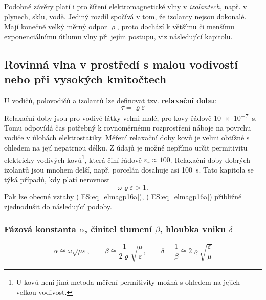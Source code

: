 {        Podobné závěry platí i pro šíření elektromagnetické vlny v \emph{izolantech}, např. v 
        plynech, sklu, vodě. Jediný rozdíl spočívá v tom, že izolanty nejsou dokonalé. Mají konečně 
        velký měrný odpor \(\varrho\), proto dochází k většímu či menšímu exponenciálnímu útlumu 
        vlny při jejím postupu, viz následující kapitolu.

    \subsection{Rovinná vlna v prostředí s malou vodivostí nebo při vysokých kmitočtech}
      U vodičů, polovodičů a izolantů lze definovat tzv. \textbf{relaxační dobu}:
      \begin{equation}\label{ES:eq_elmagp42}
        \tau = \varrho\varepsilon
      \end{equation}
      Relaxační doby jsou pro vodivé látky velmi malé, pro kovy řádově \SI{10e-7}{\s}. Tomu 
      odpovídá čas potřebný k rovnoměrnému rozprostření náboje na povrchu vodiče v úlohách 
      elektrostatiky. Měření relaxační doby kovů je velmi obtížné s ohledem na její nepatrnou 
      délku. Z údajů je možné nepřímo určit permitivitu elektricky vodivých kovů\footnote{U 
      kovů není jiná metoda měření permitivity možná s ohledem na jejich velkou vodivost.}, která 
      činí řádově \(\varepsilon_r \approx 100\). Relaxační doby dobrých izolantů jsou mnohem delší, 
      např. porcelán dosahuje asi \SI{100}{\s}. Tato kapitola se týká případů, kdy platí nerovnost
      \begin{equation}\label{ES:eq_elmagp43}
        \omega\varrho\varepsilon > 1.
      \end{equation}
      Pak lze obecné vztahy (\ref{ES:eq_elmagp16a}), (\ref{ES:eq_elmagp16a}) přibližně zjednodušit 
      do následující podoby.

    \subsubsection{Fázová konstanta \(\alpha\), činitel tlumení \(\beta\), hloubka vniku 
                     \(\delta\)}
       \begin{equation}\label{ES:eq_elmagp44}
         \alpha \cong \omega\sqrt{\mu\varepsilon}, \qquad
         \beta  \cong \frac{1}{2\varrho}\sqrt{\frac{\mu}{\varepsilon}}, \qquad
         \delta = \frac{1}{\beta}\cong2\varrho\sqrt{\frac{\varepsilon}{\mu}}
       \end{equation}

}
